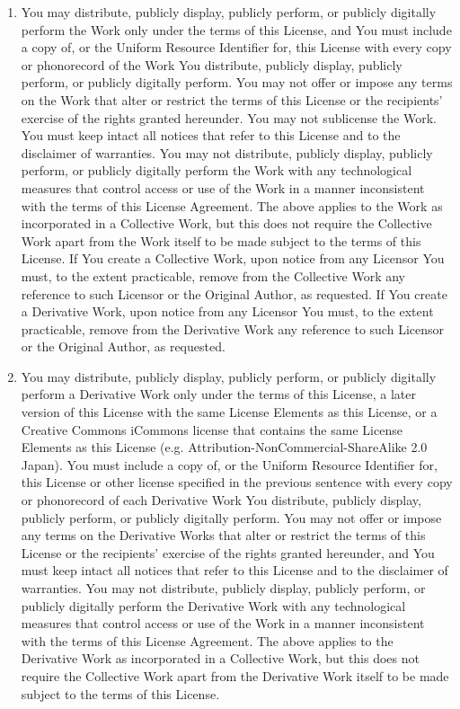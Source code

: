 \begin{enumerate}
\begin{enumerate}
\item You may distribute, publicly display, publicly perform, or
publicly digitally perform the Work only under the terms of this
License, and You must include a copy of, or the Uniform Resource
Identifier for, this License with every copy or phonorecord of the
Work You distribute, publicly display, publicly perform, or publicly
digitally perform. You may not offer or impose any terms on the Work
that alter or restrict the terms of this License or the recipients'
exercise of the rights granted hereunder. You may not sublicense the
Work. You must keep intact all notices that refer to this License and
to the disclaimer of warranties. You may not distribute, publicly
display, publicly perform, or publicly digitally perform the Work with
any technological measures that control access or use of the Work in a
manner inconsistent with the terms of this License Agreement. The
above applies to the Work as incorporated in a Collective Work, but
this does not require the Collective Work apart from the Work itself
to be made subject to the terms of this License. If You create a
Collective Work, upon notice from any Licensor You must, to the extent
practicable, remove from the Collective Work any reference to such
Licensor or the Original Author, as requested. If You create a
Derivative Work, upon notice from any Licensor You must, to the extent
practicable, remove from the Derivative Work any reference to such
Licensor or the Original Author, as requested.

\item You may distribute, publicly display, publicly perform, or
publicly digitally perform a Derivative Work only under the terms of
this License, a later version of this License with the same License
Elements as this License, or a Creative Commons iCommons license that
contains the same License Elements as this License
(e.g. Attribution-NonCommercial-ShareAlike 2.0 Japan). You must
include a copy of, or the Uniform Resource Identifier for, this
License or other license specified in the previous sentence with every
copy or phonorecord of each Derivative Work You distribute, publicly
display, publicly perform, or publicly digitally perform. You may not
offer or impose any terms on the Derivative Works that alter or
restrict the terms of this License or the recipients' exercise of the
rights granted hereunder, and You must keep intact all notices that
refer to this License and to the disclaimer of warranties. You may not
distribute, publicly display, publicly perform, or publicly digitally
perform the Derivative Work with any technological measures that
control access or use of the Work in a manner inconsistent with the
terms of this License Agreement. The above applies to the Derivative
Work as incorporated in a Collective Work, but this does not require
the Collective Work apart from the Derivative Work itself to be made
subject to the terms of this License.


\end{enumerate}
\end{enumerate}
